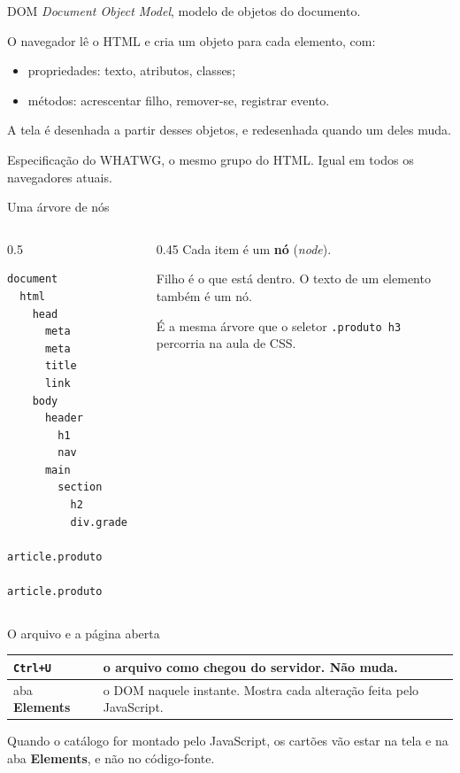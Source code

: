 \documentclass{beamer}
\begin{document}
\begin{frame}{DOM}
	\emph{Document Object Model}, modelo de objetos do documento.

	\vspace{0.3cm}
	O navegador lê o HTML e cria um objeto para cada elemento, com:
	\begin{itemize}
		\item propriedades: texto, atributos, classes;
		\item métodos: acrescentar filho, remover-se, registrar evento.
	\end{itemize}

	\vspace{0.3cm}
	A tela é desenhada a partir desses objetos, e redesenhada quando um deles
	muda.

	\vspace{0.3cm}
	Especificação do WHATWG, o mesmo grupo do HTML. Igual em todos os navegadores
	atuais.
\end{frame}

\begin{frame}[fragile]{Uma árvore de nós}
	\begin{columns}
		\begin{column}{0.5\textwidth}
			\begin{verbatim}
document
  html
    head
      meta
      meta
      title
      link
    body
      header
        h1
        nav
      main
        section
          h2
          div.grade
            article.produto
            article.produto
			\end{verbatim}
		\end{column}
		\begin{column}{0.45\textwidth}
			Cada item é um \textbf{nó} (\emph{node}).

			\vspace{0.3cm}
			Filho é o que está dentro. O texto de um elemento também é um nó.

			\vspace{0.3cm}
			É a mesma árvore que o seletor \texttt{.produto h3} percorria na aula
			de CSS.
		\end{column}
	\end{columns}
\end{frame}

\begin{frame}{O arquivo e a página aberta}
	\begin{tabular}{p{}>{\raggedright\arraybackslash}p{}}
		\toprule
		\texttt{Ctrl+U}       & o arquivo como chegou do servidor. Não muda. \\
		\midrule
		aba \textbf{Elements} & o DOM naquele instante. Mostra cada alteração
		feita pelo JavaScript. \\
		\bottomrule
	\end{tabular}

	\vspace{0.5cm}
	Quando o catálogo for montado pelo JavaScript, os cartões vão estar na tela
	e na aba \textbf{Elements}, e não no código-fonte.
\end{frame}
\end{document}
